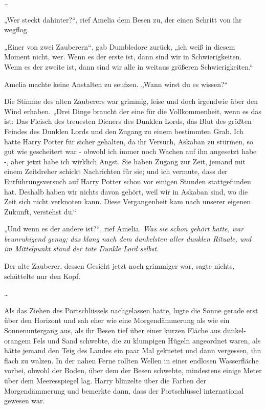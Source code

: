 {…

„Wer steckt dahinter?“, rief Amelia dem Besen zu, der einen Schritt von ihr wegflog.

„Einer von zwei Zauberern“, gab Dumbledore zurück, „ich weiß in diesem Moment nicht, wer. Wenn es der erste ist, dann sind wir in Schwierigkeiten. Wenn es der zweite ist, dann sind wir alle in weitaus größeren Schwierigkeiten.“

Amelia machte keine Anstalten zu seufzen. „Wann wirst du es wissen?“

Die Stimme des alten Zauberers war grimmig, leise und doch irgendwie über den Wind erhaben. „Drei Dinge braucht der eine für die Vollkommenheit, wenn es das ist: Das Fleisch des treuesten Dieners des Dunklen Lords, das Blut des größten Feindes des Dunklen Lords und den Zugang zu einem bestimmten Grab. Ich hatte Harry Potter für sicher gehalten, da ihr Versuch, Askaban zu stürmen, so gut wie gescheitert war - obwohl ich immer noch Wachen auf ihn angesetzt habe -, aber jetzt habe ich wirklich Angst. Sie haben Zugang zur Zeit, jemand mit einem Zeitdreher schickt Nachrichten für sie; und ich vermute, dass der Entführungsversuch auf Harry Potter schon vor einigen Stunden stattgefunden hat. Deshalb haben wir nichts davon gehört, weil wir in Askaban sind, wo die Zeit sich nicht verknoten kann. Diese Vergangenheit kam nach unserer eigenen Zukunft, verstehst du.“

„Und wenn es der andere ist?“, rief Amelia. \emph{Was sie schon gehört hatte, war beunruhigend genug; das klang nach dem dunkelsten aller dunklen Rituale, und im Mittelpunkt stand der tote Dunkle Lord selbst.}

Der alte Zauberer, dessen Gesicht jetzt noch grimmiger war, sagte nichts, schüttelte nur den Kopf.

…

Als das Ziehen des Portschlüssels nachgelassen hatte, lugte die Sonne gerade erst über den Horizont und sah eher wie eine Morgendämmerung als wie ein Sonnenuntergang aus, als ihr Besen tief über einer kurzen Fläche aus dunkel-orangem Fels und Sand schwebte, die zu klumpigen Hügeln angeordnet waren, als hätte jemand den Teig des Landes ein paar Mal geknetet und dann vergessen, ihn flach zu walzen. In der nahen Ferne rollten Wellen in einer endlosen Wasserfläche vorbei, obwohl der Boden, über dem der Besen schwebte, mindestens einige Meter über dem Meeresspiegel lag. Harry blinzelte über die Farben der Morgendämmerung und bemerkte dann, dass der Portschlüssel international gewesen war.

}
